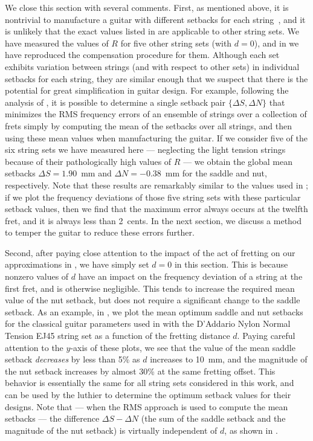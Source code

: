 We close this section with several comments. First, as mentioned above, it is nontrivial to manufacture a guitar with different setbacks for each string~\cite{ref:byers1996cgi}, and it is unlikely that the exact values listed in  are applicable to other string sets. We have measured the values of $R$ for five other string sets (with $d = 0$), and in  we have reproduced the compensation procedure for them. Although each set exhibits variation between strings (and with respect to other sets) in individual setbacks for each string, they are similar enough that we suspect that there is the potential for great simplification in guitar design. For example, following the analysis of , it is possible to determine a single setback pair $\{\Delta S, \Delta N\}$ that minimizes the RMS frequency errors of an ensemble of strings over a collection of frets simply by computing the mean of the setbacks over all strings, and then using these mean values when manufacturing the guitar. If we consider five of the six string sets we have measured here --- neglecting the light tension strings because of their pathologically high values of $R$ --- we obtain the global mean setbacks $\Delta S = 1.90$~mm and $\Delta N = -0.38$~mm for the saddle and nut, respectively. Note that these results are remarkably similar to the values used in ; if we plot the frequency deviations of those five string sets with these particular setback values, then we find that the maximum error always occurs at the twelfth fret, and it is always less than 2~cents. In the next section, we discuss a method to temper the guitar to reduce these errors further.

Second, after paying close attention to the impact of the act of fretting on our approximations in , we have simply set $d = 0$ in this section. This is because nonzero values of $d$ have an impact on the frequency deviation of a string at the first fret, and is otherwise negligible. This tends to increase the required mean value of the nut setback, but does not require a significant change to the saddle setback. As an example, in , we plot the mean optimum saddle and nut setbacks for the classical guitar parameters used in  with the D'Addario Nylon Normal Tension EJ45 string set as a function of the fretting distance $d$. Paying careful attention to the $y$-axis of these plots, we see that the value of the mean saddle setback \emph{decreases} by less than 5\% as $d$ increases to 10~mm, and the magnitude of the nut setback increases by almost 30\% at the same fretting offset. This behavior is essentially the same for all string sets considered in this work, and can be used by the luthier to determine the optimum setback values for their designs. Note that --- when the RMS approach is used to compute the mean setbacks --- the difference $\Delta S - \Delta N$ (the sum of the saddle setback and the magnitude of the nut setback) is virtually independent of $d$, as shown in .

